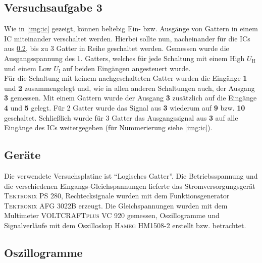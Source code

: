 \documentclass[numbers=noenddot,12pt,a4paper]{scrartcl}
\newcommand{\ix}[1]{_\text{#1}}
\begin{document}
\subsection{Versuchsaufgabe 3}
Wie in \ref{img:ic} gezeigt, können beliebig Ein- bzw. Ausgänge von Gattern in einem IC miteinander verschaltet werden. Hierbei sollte nun, nacheinander für die ICs aus \ref{sec:gerät}, bis zu 3 Gatter in Reihe geschaltet werden. Gemessen wurde die Ausgangsspannung des 1. Gatters, welches für jede Schaltung mit einem High $U\ix{H}$ und einem Low $U\ix{l}$ auf beiden Eingängen angesteuert wurde. \\
Für die Schaltung mit keinem nachgeschalteten Gatter wurden die Eingänge \textbf{1} und \textbf{2} zusammengelegt und, wie in allen anderen Schaltungen auch, der Ausgang \textbf{3} gemessen. Mit einem Gattern wurde der Ausgang \textbf{3} zusätzlich auf die Eingänge \textbf{4} und \textbf{5} gelegt. Für 2 Gatter wurde das Signal aus \textbf{3} wiederum auf \textbf{9} bzw. \textbf{10} geschaltet. Schließlich wurde für 3 Gatter das Ausgangssignal aus \textbf{3} auf alle Eingänge des ICs weitergegeben (für Nummerierung siehe \ref{img:ic}).
\subsection{Geräte} \label{sec:gerät}
Die verwendete Versuchsplatine ist "`Logisches Gatter"'. Die Betriebsspannung und die verschiedenen Eingangs-Gleichspannungen lieferte das Stromversorgungsgerät \textsc{Tektronix PS 280}, Rechtecksignale wurden mit dem Funktionsgenerator \textsc{Tektronix AFG 3022B} erzeugt. Die Gleichspannungen wurden mit dem Multimeter \textsc{VOLTCRAFTplus VC 920} gemessen, Oszillogramme und Signalverläufe mit dem Oszilloskop \textsc{Hameg HM1508-2} erstellt bzw. betrachtet.
\subsection{Oszillogramme}
\end{document}

